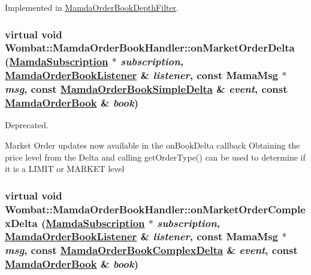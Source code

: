 Implemented in \hyperlink{classMamdaOrderBookDepthFilter_1816fe7b1f93ae44a94127c8995f7a26}{Mamda\-Order\-Book\-Depth\-Filter}.\hypertarget{classWombat_1_1MamdaOrderBookHandler_f62d90cce9788330e3b0e42d22e72d05}{
\subsubsection[onMarketOrderDelta]{\setlength{\rightskip}{0pt plus 5cm}virtual void Wombat::Mamda\-Order\-Book\-Handler::on\-Market\-Order\-Delta (\hyperlink{classWombat_1_1MamdaSubscription}{Mamda\-Subscription} $\ast$ {\em subscription}, \hyperlink{classWombat_1_1MamdaOrderBookListener}{Mamda\-Order\-Book\-Listener} \& {\em listener}, const Mama\-Msg $\ast$ {\em msg}, const \hyperlink{classWombat_1_1MamdaOrderBookSimpleDelta}{Mamda\-Order\-Book\-Simple\-Delta} \& {\em event}, const \hyperlink{classWombat_1_1MamdaOrderBook}{Mamda\-Order\-Book} \& {\em book})}}
\label{classWombat_1_1MamdaOrderBookHandler_f62d90cce9788330e3b0e42d22e72d05}


Deprecated. 

Market Order updates now available in the on\-Book\-Delta callback Obtaining the price level from the Delta and calling get\-Order\-Type() can be used to determine if it is a LIMIT or MARKET level \hypertarget{classWombat_1_1MamdaOrderBookHandler_27f1cb6978ef96b94fed8f612906b65a}{
\subsubsection[onMarketOrderComplexDelta]{\setlength{\rightskip}{0pt plus 5cm}virtual void Wombat::Mamda\-Order\-Book\-Handler::on\-Market\-Order\-Complex\-Delta (\hyperlink{classWombat_1_1MamdaSubscription}{Mamda\-Subscription} $\ast$ {\em subscription}, \hyperlink{classWombat_1_1MamdaOrderBookListener}{Mamda\-Order\-Book\-Listener} \& {\em listener}, const Mama\-Msg $\ast$ {\em msg}, const \hyperlink{classWombat_1_1MamdaOrderBookComplexDelta}{Mamda\-Order\-Book\-Complex\-Delta} \& {\em event}, const \hyperlink{classWombat_1_1MamdaOrderBook}{Mamda\-Order\-Book} \& {\em book})}}
\label{classWombat_1_1MamdaOrderBookHandler_27f1cb6978ef96b94fed8f612906b65a}


